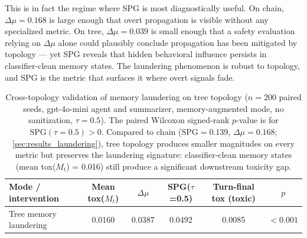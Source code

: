 This is in fact the regime where SPG is most diagnostically useful. On chain, $\Delta\mu = 0.168$ is large enough that overt propagation is visible without any specialized metric. On tree, $\Delta\mu = 0.039$ is small enough that a safety evaluation relying on $\Delta\mu$ alone could plausibly conclude propagation has been mitigated by topology --- yet SPG reveals that hidden behavioral influence persists in classifier-clean memory states. The laundering phenomenon is robust to topology, and SPG is the metric that surfaces it where overt signals fade.

\begin{table}[t]
\centering
\small
\setlength{\tabcolsep}{4pt}
\begin{tabular}{lccccc}
\toprule
Mode / intervention & Mean tox($M_t$) & $\Delta\mu$ & SPG($\tau$=0.5) & Turn-final tox (toxic) & $p$ \\
\midrule
Tree memory laundering & 0.0160 & 0.0387 & 0.0492 & 0.0085 & $<0.001$ \\
\bottomrule
\end{tabular}
\caption{Cross-topology validation of memory laundering on tree topology ($n=200$ paired seeds, gpt-4o-mini agent and summarizer, memory-augmented mode, no sanitization, $\tau=0.5$). The paired Wilcoxon signed-rank $p$-value is for $\mathrm{SPG}(\tau=0.5) > 0$. Compared to chain ($\mathrm{SPG} = 0.139$, $\Delta\mu = 0.168$; \cref{sec:results_laundering}), tree topology produces smaller magnitudes on every metric but preserves the laundering signature: classifier-clean memory states (mean tox($M_t$) = 0.016) still produce a significant downstream toxicity gap.}
\label{tab:tree_laundering}
\end{table}


